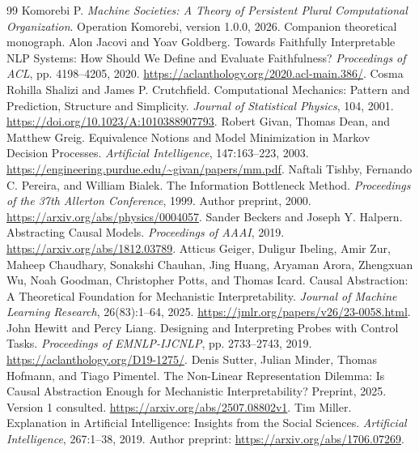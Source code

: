 \documentclass[11pt,letterpaper]{article}
\theoremstyle{plain}
\theoremstyle{definition}
\begin{document}
\clearpage
{}
\begin{thebibliography}{99}\fontsize{9.5}{11}\selectfont
\setlength{\itemsep}{3pt}\setlength{\parsep}{0pt}\setlength{\parskip}{0pt}
 Komorebi P. \emph{Machine Societies: A Theory of Persistent Plural Computational Organization}. Operation Komorebi, version 1.0.0, 2026. Companion theoretical monograph.
 Alon Jacovi and Yoav Goldberg. Towards Faithfully Interpretable NLP Systems: How Should We Define and Evaluate Faithfulness? \emph{Proceedings of ACL}, pp. 4198--4205, 2020. \url{https://aclanthology.org/2020.acl-main.386/}.
 Cosma Rohilla Shalizi and James P. Crutchfield. Computational Mechanics: Pattern and Prediction, Structure and Simplicity. \emph{Journal of Statistical Physics}, 104, 2001. \url{https://doi.org/10.1023/A:1010388907793}.
 Robert Givan, Thomas Dean, and Matthew Greig. Equivalence Notions and Model Minimization in Markov Decision Processes. \emph{Artificial Intelligence}, 147:163--223, 2003. \url{https://engineering.purdue.edu/~givan/papers/mm.pdf}.
 Naftali Tishby, Fernando C. Pereira, and William Bialek. The Information Bottleneck Method. \emph{Proceedings of the 37th Allerton Conference}, 1999. Author preprint, 2000. \url{https://arxiv.org/abs/physics/0004057}.
 Sander Beckers and Joseph Y. Halpern. Abstracting Causal Models. \emph{Proceedings of AAAI}, 2019. \url{https://arxiv.org/abs/1812.03789}.
 Atticus Geiger, Duligur Ibeling, Amir Zur, Maheep Chaudhary, Sonakshi Chauhan, Jing Huang, Aryaman Arora, Zhengxuan Wu, Noah Goodman, Christopher Potts, and Thomas Icard. Causal Abstraction: A Theoretical Foundation for Mechanistic Interpretability. \emph{Journal of Machine Learning Research}, 26(83):1--64, 2025. \url{https://jmlr.org/papers/v26/23-0058.html}.
 John Hewitt and Percy Liang. Designing and Interpreting Probes with Control Tasks. \emph{Proceedings of EMNLP-IJCNLP}, pp. 2733--2743, 2019. \url{https://aclanthology.org/D19-1275/}.
 Denis Sutter, Julian Minder, Thomas Hofmann, and Tiago Pimentel. The Non-Linear Representation Dilemma: Is Causal Abstraction Enough for Mechanistic Interpretability? Preprint, 2025. Version 1 consulted. \url{https://arxiv.org/abs/2507.08802v1}.
 Tim Miller. Explanation in Artificial Intelligence: Insights from the Social Sciences. \emph{Artificial Intelligence}, 267:1--38, 2019. Author preprint: \url{https://arxiv.org/abs/1706.07269}.

\end{thebibliography}
\end{document}

